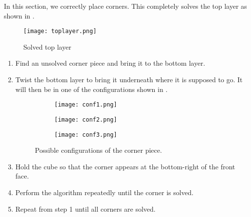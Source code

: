 In this section, we correctly place corners. This completely solves the top layer as shown in .
\begin{figure}[h]
	\centering
	\texttt{[image: toplayer.png]}
	\caption{Solved top layer}\label{fig:toplayer}
\end{figure}
\begin{enumerate}
	\item Find an unsolved corner piece and bring it to the bottom layer.
	\item Twist the bottom layer to bring it underneath where it is supposed to go. It will then be in one of the configurations shown in .
\begin{figure}[h]
	\centering
	\begin{subfigure}[b]{0.3\textwidth}
		\texttt{[image: conf1.png]}
	\end{subfigure}
	\begin{subfigure}[b]{0.3\textwidth}
		\texttt{[image: conf2.png]}
	\end{subfigure}
	\begin{subfigure}[b]{0.3\textwidth}
		\texttt{[image: conf3.png]}
	\end{subfigure}
	\caption{Possible configurations of the corner piece.}\label{fig:confs}
\end{figure}
	\item Hold the cube so that the corner appears at the bottom-right of the front face.
	\item Perform the algorithm  repeatedly until the corner is solved.
	\item Repeat from step 1 until all corners are solved.
\end{enumerate}